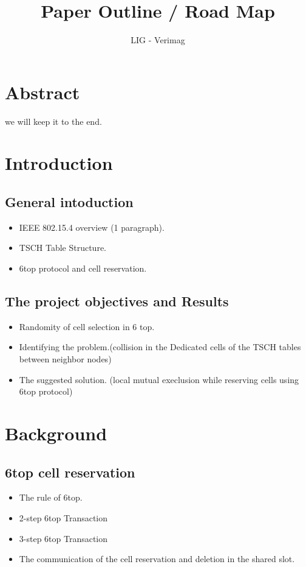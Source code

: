 \documentclass[a4paper,10pt]{article}
\title{Paper Outline / Road Map }
\author{LIG - Verimag}
\begin{document}
\maketitle
\section{Abstract}
 we will keep it to the end. 

\section{Introduction}
\subsection{General intoduction} 

\begin{itemize}
  \item IEEE 802.15.4 overview (1 paragraph).
  \item TSCH Table Structure.
  \item 6top protocol and cell reservation.
\end{itemize}

 
\subsection{The project objectives and Results}

\begin{itemize}
  \item Randomity of cell selection in 6 top.
  \item Identifying the problem.(collision in the Dedicated cells of the TSCH tables between neighbor nodes)
  \item The suggested solution. (local mutual execlusion while reserving cells using 6top protocol)
\end{itemize}

\section{Background}
\subsection{6top cell reservation}
\begin{itemize}
  \item The rule of 6top.
  \item 2-step 6top Transaction
  \item 3-step 6top Transaction
  \item The communication of the cell reservation and deletion in the shared slot. 
  \end{itemize}
\end{document}
